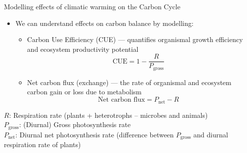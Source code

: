 \documentclass[xcolor={usenames,x11names},compress]{beamer}
\renewcommand{\(}{\begin{columns}}
\renewcommand{\)}{\end{columns}}
\newcommand{\<}[1]{\begin{column}{#1}}
\renewcommand{\>}{\end{column}}
\begin{document}



\begin{frame}{Modelling effects of climatic warming on the Carbon Cycle}

  \begin{itemize}[<+->] \itemsep6pt
			\item We can understand effects on carbon balance by modelling:
      \begin{itemize} \itemsep4pt
				\item Carbon Use Efficiency (CUE) --- quantifies organismal growth efficiency and ecosystem productivity potential
					$$\textrm{CUE}  = 1 - \frac{R}{P_{\textrm{gross}}}$$
				\item Net carbon flux (exchange) --- the rate of organismal and 
				ecosystem carbon gain or loss due to metabolism
				$$\textrm{Net carbon flux} = P_{\textrm{net}} - R$$
			\end{itemize}
  \end{itemize}
  $R$: Respiration rate (plants + heterotrophs -- microbes and animals)\\
  $P_{\text{gross}}$: (Diurnal) Gross photosynthesis rate \\ 
  $P_{\text{net}}$: Diurnal net photosynthesis rate (difference between $P_\text{gross}$ and diurnal respiration rate of plants)

\end{frame}
\end{document}
